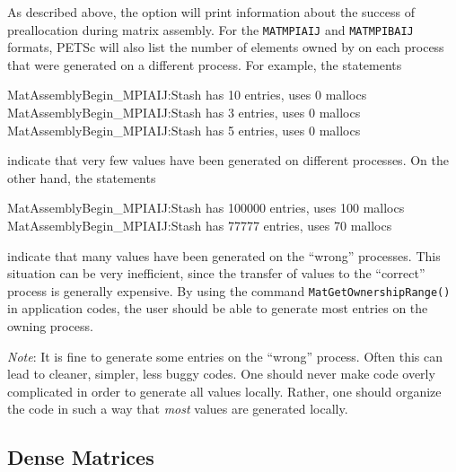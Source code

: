 As described above, the option  
will print information about the success of preallocation during
matrix assembly.  For the \lstinline{MATMPIAIJ} and \lstinline{MATMPIBAIJ} formats, PETSc will also list
the number of elements owned by on each process that were generated
on a different process.  For example, the statements
\begin{outputlisting}
MatAssemblyBegin_MPIAIJ:Stash has 10 entries, uses 0 mallocs 
MatAssemblyBegin_MPIAIJ:Stash has 3 entries, uses 0 mallocs 
MatAssemblyBegin_MPIAIJ:Stash has 5 entries, uses 0 mallocs
\end{outputlisting}
indicate that very few values have been generated on different processes.
On the other hand, the statements
\begin{outputlisting}
MatAssemblyBegin_MPIAIJ:Stash has 100000 entries, uses 100 mallocs 
MatAssemblyBegin_MPIAIJ:Stash has 77777 entries, uses 70 mallocs
\end{outputlisting}
indicate that many values have been generated on the ``wrong'' processes.
This situation can be very inefficient, since the transfer of values
to the ``correct'' process is generally expensive.  By using the command
\lstinline{MatGetOwnershipRange()} in application codes, the user should be able
to generate most entries on the owning process.

{\em Note}: It is fine to generate some entries on the ``wrong'' process. Often
this can lead to cleaner, simpler, less buggy codes.  One should never
make code overly complicated in order to generate all values locally. Rather,
one should organize the code in such a way that {\em most} values are generated locally.

\subsection{Dense Matrices}
\label{sec_matdense}

